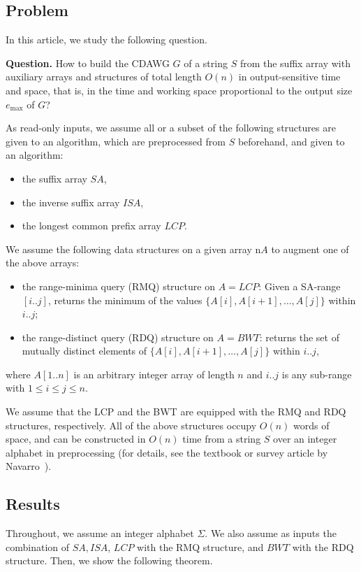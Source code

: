 \documentclass{article}
\begin{document}
\subsection{Problem}
In this article, we study the following question. 

\begin{trivlist}{\item[] \noindent \textbf{Question.}
How to build the CDAWG $G$ of a string $S$ from the suffix array with auxiliary arrays and structures of total length $O(n)$ in output-sensitive time and space, that is, in the time and working space proportional to the output size $e_{\max}$ of $G$?
}\end{trivlist}

As read-only inputs, we assume all or a subset of the following structures are given to an algorithm, which are preprocessed from $S$ beforehand, and given to an algorithm:
\begin{itemize}
\item the suffix array $SA$,
\item the inverse suffix array $ISA$,
\item the longest common prefix array $LCP$.
\end{itemize}

We assume the following data structures on a given array n$A$ to augment one of the above arrays:  
\begin{itemize}
\item the range-minima query (RMQ) structure on $A = LCP$: Given a SA-range $[i..j]$, returns the minimum of the values $\{A[i], A[i+1], \dots, A[j]\}$ within $i..j$; 
  
\item the range-distinct query (RDQ) structure on $A = BWT$: returns the set of mutually distinct elements of $\{A[i], A[i+1], \dots, A[j]\}$ within $i..j$, 
\end{itemize}
where $A[1..n]$ is an arbitrary integer array of length $n$ and $i..j$ is any sub-range with $1\le i\le j\le n$. 

We assume that the LCP and the BWT are equipped with the RMQ and RDQ structures, respectively. 
All of the above structures occupy $O(n)$ words of space, and can be constructed in $O(n)$ time from a string $S$ over an integer alphabet in preprocessing (for details, see the textbook or survey article by Navarro~\cite{navarro2016cds:book,navarro2021indexing:ii}).

\subsection{Results}
Throughout, we assume an integer alphabet $\Sigma$.
We also assume as inputs the combination of $SA, ISA$, $LCP$ with the RMQ structure, and $BWT$ with the RDQ structure. 
Then, we show the following theorem.
\end{document}
